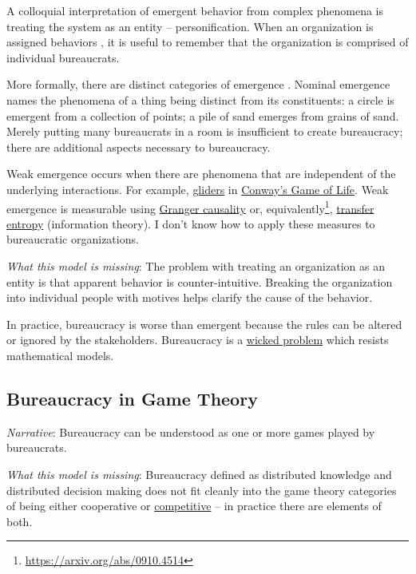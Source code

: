 A colloquial interpretation of emergent behavior from complex phenomena is treating the system as an entity -- personification. When an organization is assigned behaviors \cite{2002_Gall}, it is useful to remember that the organization is comprised of individual bureaucrats. 


More formally, there are distinct categories of emergence \cite{2002_Bedau}. Nominal emergence names the phenomena of a thing being distinct from its constituents: a circle is emergent from a collection of points; a pile of sand emerges from grains of sand. Merely putting many bureaucrats in a room is insufficient to create bureaucracy; there are additional aspects necessary to bureaucracy. 

Weak emergence occurs when there are phenomena that are independent of the underlying interactions. For example, \href{https://en.wikipedia.org/wiki/Glider_(Conway\%27s_Life)}{gliders} in \href{https://en.wikipedia.org/wiki/Conway\%27s_Game_of_Life}{Conway's Game of Life}.
Weak emergence is measurable using \href{https://en.wikipedia.org/wiki/Granger_causality}{Granger causality} or, equivalently\footnote{\href{https://arxiv.org/abs/0910.4514}{https://arxiv.org/abs/0910.4514}}, \href{https://en.wikipedia.org/wiki/Transfer_entropy}{transfer entropy} (information theory). I don't know how to apply these measures to bureaucratic organizations. 

\textit{What this model is missing}: The problem with treating an organization as an entity is that apparent behavior is counter-intuitive. Breaking the organization into individual people with motives helps clarify the cause of the behavior. 

In practice, bureaucracy is worse than emergent because the rules can be altered or ignored by the stakeholders. Bureaucracy is a \href{https://en.wikipedia.org/wiki/Wicked_problem}{wicked problem} which resists mathematical models. 

\subsection{Bureaucracy in Game Theory}
\textit{Narrative}: Bureaucracy can be understood as one or more games played by bureaucrats. 

\textit{What this model is missing}: Bureaucracy defined as distributed knowledge and distributed decision making does not fit cleanly into the game theory categories of being either cooperative or \href{https://en.wikipedia.org/wiki/Non-cooperative_game_theory}{competitive} -- in practice there are elements of both. 

